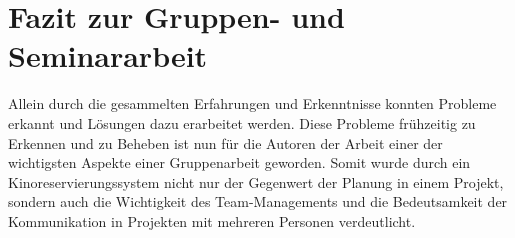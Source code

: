 \section{Fazit zur Gruppen- und Seminararbeit}

Allein durch die gesammelten Erfahrungen und Erkenntnisse konnten Probleme erkannt und Lösungen dazu erarbeitet werden.
Diese Probleme frühzeitig zu Erkennen und zu Beheben ist nun für die Autoren der Arbeit einer der wichtigsten Aspekte einer Gruppenarbeit geworden.
Somit wurde durch ein Kinoreservierungssystem nicht nur der Gegenwert der Planung in einem Projekt, sondern auch die Wichtigkeit des Team-Managements und die Bedeutsamkeit der Kommunikation in Projekten mit mehreren Personen verdeutlicht.
